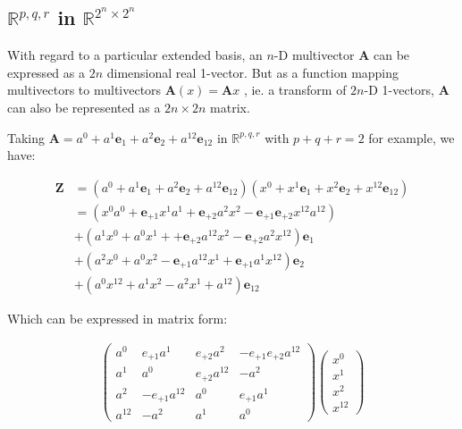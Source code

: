 \documentclass[a4paper]{book}
\numberwithin{equation}{chapter}
\begin{document}
    \subsection{$\mathbb{R}^{p,q,r}$ in $\mathbb{R}^{2^n \times 2^n}$}

With regard to a particular extended basis, an $n$-D multivector $\mathbf{A}$ can be expressed 
as a $2n$ dimensional real 1-vector. But as a function mapping multivectors to multivectors
$\mathbf{A}(x) = \mathbf{A}x$ , ie. a transform of $2n$-D 1-vectors, 
$\mathbf{A}$ can also be represented as a $2n\times 2n$ matrix.

\vspace{\baselineskip}

Taking $\mathbf{A}=a^0+a^1\mathbf{e}_1+a^2\mathbf{e}_2+a^{12}\mathbf{e}_{12}$
in $\mathbb{R}^{p,q,r}$ with $p+q+r=2$ for example, we have:

\begin{align*}
    \mathbf{Z}&=(a^0+a^1\mathbf{e}_1+a^2\mathbf{e}_2+a^{12}\mathbf{e}_{12})
    (x^0+x^1\mathbf{e}_1+x^2\mathbf{e}_2+x^{12}\mathbf{e}_{12})\\
    &=(x^0a^0 + \mathbf{e}_{+1} x^1a^1 + \mathbf{e}_{+2}a^2x^2 -
    \mathbf{e}_{+1}\mathbf{e}_{+2}x^{12}a^{12})\\
    &+( a^1x^0 + a^0x^1 + +\mathbf{e}_{+2}a^{12}x^2- \mathbf{e}_{+2} a^2x^{12})\mathbf{e}_1 \\
    &+( a^2x^0 + a^0x^2 - \mathbf{e}_{+1} a^{12} x^1 + \mathbf{e}_{+1}a^1x^{12})\mathbf{e}_2 \\
    &+( a^0x^{12} + a^1x^2 - a^2x^1 + a^{12} ) \mathbf{e}_{12}
\end{align*}

Which can be expressed in matrix form:

    \begin{align*}
    \begin{pmatrix}
    a^0 & e_{+1}a^1  & e_{+2}a^2 & -e_{+1}e_{+2}a^{12} \\
    a^1 & a^0 & e_{+2}a^{12} & -a^2\\
    a^2 & -e_{+1}a^{12} & a^0 & e_{+1}a^1 \\
    a^{12}& -a^2 & a^1 & a^0
    \end{pmatrix}
    \begin{pmatrix}
    x^0\\
    x^1\\
    x^2\\
    x^{12}
    \end{pmatrix}
    \end{align*}
\end{document}
